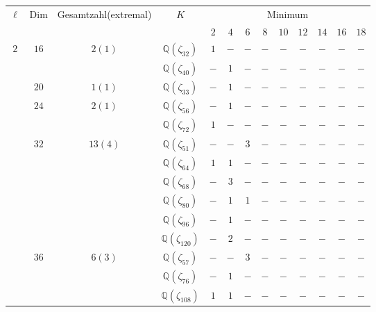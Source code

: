 \documentclass[12pt,a4paper,halfparskip,headsepline,bibtotocnumbered]{scrreprt}
\theoremstyle{nummermitklammern}
\theoremstyle{nonumberbreak}
\newcommand{\Q}{\mathbb{Q}}
\begin{document}
\begin{table}
	\centering
	\begin{tabular}{|c|c|c|c|c|c|c|c|c|c|c|c|c|}
		\hline		
		\multirow{2}{*}{$\ell$}	&\multirow{2}{*}{Dim}	&\multirow{2}{*}{Gesamtzahl(extremal)}	&\multirow{2}{*}{$K$}	&\multicolumn{9}{c|}{Minimum}\\ \cline{5-13}
								&						&							&					&$2$	&$4$	&$6$	&$8$	&$10$	&$12$	&$14$	&$16$	&$18$\\ \hline
		\multirow{14}{*}{$2$}	&\multirow{2}{*}{$16$}	&\multirow{2}{*}{$2(1)$}	&$\Q(\zeta_{32})$	&$1$	&$-$	&$-$	&$-$	&$-$	&$-$	&$-$	&$-$	&$-$\\ \cline{4-13}
								&						&							&$\Q(\zeta_{40})$	&$-$	&$1$	&$-$	&$-$	&$-$	&$-$	&$-$	&$-$	&$-$\\ \cline{2-13}
								&$20$					&$1(1)$						&$\Q(\zeta_{33})$	&$-$	&$1$	&$-$	&$-$	&$-$	&$-$	&$-$	&$-$	&$-$\\ \cline{2-13}
								&\multirow{2}{*}{$24$}	&\multirow{2}{*}{$2(1)$}	&$\Q(\zeta_{56})$	&$-$	&$1$	&$-$	&$-$	&$-$	&$-$	&$-$	&$-$	&$-$\\ \cline{4-13}
								&						&							&$\Q(\zeta_{72})$	&$1$	&$-$	&$-$	&$-$	&$-$	&$-$	&$-$	&$-$	&$-$\\ \cline{2-13}
								&\multirow{6}{*}{$32$}	&\multirow{6}{*}{$13(4)$}	&$\Q(\zeta_{51})$	&$-$	&$-$	&$3$	&$-$	&$-$	&$-$	&$-$	&$-$	&$-$\\ \cline{4-13}
								&						&							&$\Q(\zeta_{64})$	&$1$	&$1$	&$-$	&$-$	&$-$	&$-$	&$-$	&$-$	&$-$\\ \cline{4-13}
								&						&							&$\Q(\zeta_{68})$	&$-$	&$3$	&$-$	&$-$	&$-$	&$-$	&$-$	&$-$	&$-$\\ \cline{4-13}
								&						&							&$\Q(\zeta_{80})$	&$-$	&$1$	&$1$	&$-$	&$-$	&$-$	&$-$	&$-$	&$-$\\ \cline{4-13}
								&						&							&$\Q(\zeta_{96})$	&$-$	&$1$	&$-$	&$-$	&$-$	&$-$	&$-$	&$-$	&$-$\\ \cline{4-13}
								&						&							&$\Q(\zeta_{120})$	&$-$	&$2$	&$-$	&$-$	&$-$	&$-$	&$-$	&$-$	&$-$\\ \cline{2-13}
								&\multirow{3}{*}{$36$}	&\multirow{3}{*}{$6(3)$}	&$\Q(\zeta_{57})$	&$-$	&$-$	&$3$	&$-$	&$-$	&$-$	&$-$	&$-$	&$-$\\ \cline{4-13}
								&						&							&$\Q(\zeta_{76})$	&$-$	&$1$	&$-$	&$-$	&$-$	&$-$	&$-$	&$-$	&$-$\\ \cline{4-13}
								&						&							&$\Q(\zeta_{108})$	&$1$	&$1$	&$-$	&$-$	&$-$	&$-$	&$-$	&$-$	&$-$\\ \hline

\end{tabular}
\end{table}
\end{document}
